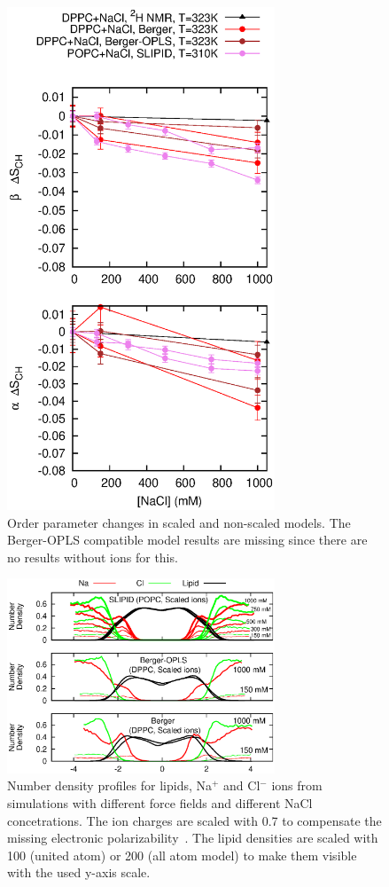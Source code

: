 \documentclass[pre,aps,floatfix,authordate1-4,twocolumn]{revtex4-1}
\begin{document}
\begin{figure}[]
  \centering
  \includegraphics[width=8cm]{../Fig/OrderParameterIONSchangesSCALED.eps} %
  \caption{\label{OPchangesSCALED}
    Order parameter changes in scaled and non-scaled models. The Berger-OPLS compatible model results are missing since there are
    no results without ions for this.
}
\end{figure}

\begin{figure}[]
  \centering
  \includegraphics[width=8cm]{../Fig/NAdensitiesSCALED.eps} %
  \caption{\label{NAdensitySCALED}
    Number density profiles for lipids, Na$^+$ and Cl$^-$ ions from simulations with different force fields and different NaCl concetrations. 
    The ion charges are scaled with 0.7 to compensate the missing electronic polarizability~\cite{leontyev11}.
    The lipid densities are scaled with 100 (united atom) or 200 (all atom model) to make them visible with the used y-axis scale.
}
\end{figure}
\end{document}
